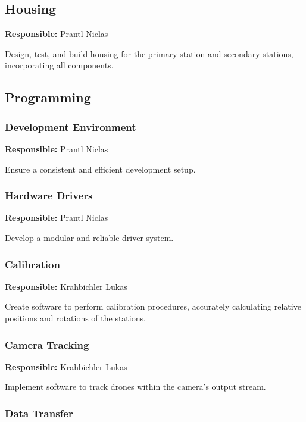 \subsection{Housing}

\textbf{Responsible:} Prantl Niclas

Design, test, and build housing for the primary station and secondary stations, incorporating all components.

\subsection{Programming}

\subsubsection{Development Environment}

\textbf{Responsible:} Prantl Niclas

Ensure a consistent and efficient development setup.

\subsubsection{Hardware Drivers}

\textbf{Responsible:} Prantl Niclas

Develop a modular and reliable driver system.

\subsubsection{Calibration}

\textbf{Responsible:} Krahbichler Lukas

Create software to perform calibration procedures, accurately calculating relative positions and rotations of the stations.

\subsubsection{Camera Tracking}

\textbf{Responsible:} Krahbichler Lukas

Implement software to track drones within the camera's output stream.

\subsubsection{Data Transfer}

